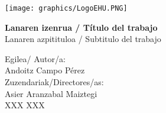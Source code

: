 \setlength{\parskip}{12pt}
\setlength{\parindent}{0cm}
\renewcommand{\arraystretch}{1.2}
\setcounter{secnumdepth}{4}

\geometry{top=2.5cm, bottom=2.5cm, left=2.5cm, right=2.5cm}




\renewcommand{\listtablename}{Índice de tablas}
\renewcommand{\tablename}{Tabla}


\begin{titlepage}
\hspace*{-3.5cm}
    \begin{minipage}{\textwidth}
        \vspace{-2.5cm}
        \begin{center}
    

            \texttt{[image: graphics/LogoEHU.PNG]}
        \end{center}
    \end{minipage}

\vspace{1cm}

\hspace{-3.1cm}
\noindent{}


\vspace{0.8cm}

\noindent\hspace*{-2.5cm}%
\colorbox{light-gray}{\begin{minipage}{\paperwidth}%

    \vspace{1cm}

    \color{RoyalBlue}
    \centering\Large\textbf{ Lanaren izenrua / Título del trabajo}
    \\
    \centering\textmd{ Lanaren azpitituloa / Subtitulo del trabajo}


    \vspace{6cm}\mbox{}
  \end{minipage}
}

\begin{flushright}
 Egilea/ Autor/a:
\\
Andoitz Campo Pérez
\\
Zuzendariak/Directores/as:
\\
Asier Aranzabal Maiztegi
\\
XXX XXX                      
\\
\end{flushright}


\end{titlepage}
